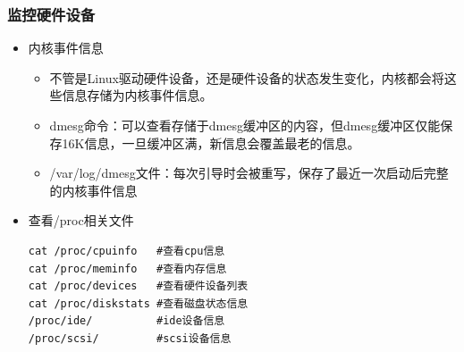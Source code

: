 \documentclass[xcolor=svgnames,presentation]{beamer}
\begin{document}
\begin{frame}[fragile]
\frametitle{监控硬件设备}
\label{sec-4-4}
\begin{itemize}

\item 内核事件信息
\label{sec-4-4-1}%
\begin{itemize}

\item 不管是Linux驱动硬件设备，还是硬件设备的状态发生变化，内核都会将这些信息存储为内核事件信息。
\label{sec-4-4-1-1}%

\item dmesg命令：可以查看存储于dmesg缓冲区的内容，但dmesg缓冲区仅能保存16K信息，一旦缓冲区满，新信息会覆盖最老的信息。
\label{sec-4-4-1-2}%

\item /var/log/dmesg文件：每次引导时会被重写，保存了最近一次启动后完整的内核事件信息
\label{sec-4-4-1-3}%
\end{itemize} %

\item 查看/proc相关文件\\
\label{sec-4-4-2}%
\begin{verbatim}
cat /proc/cpuinfo   #查看cpu信息
cat /proc/meminfo   #查看内存信息
cat /proc/devices   #查看硬件设备列表
cat /proc/diskstats #查看磁盘状态信息
/proc/ide/          #ide设备信息
/proc/scsi/         #scsi设备信息
\end{verbatim}
\end{itemize} %
\end{frame}
\end{document}
